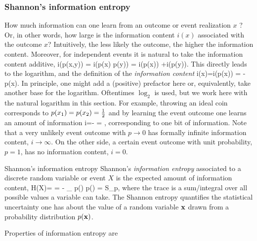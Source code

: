 \subsubsection{Shannon's information entropy}
How much information can one learn from an outcome or event realization $x$ ? Or, in other words, how large is the information content $i(x)$ associated with the outcome $x$? Intuitively, the less likely the outcome, the higher the information content. Moreover, for independent events it is natural to take the information content additive,
\be 
i(p(x,y)) = i(p(x) p(y)) = i(p(x)) +i(p(y)).
\ee 
This directly leads to the logarithm, and the definition of the \emph{information content}
\be 
i(x)=i(p(x)) = -\ln p(x).
\ee 
In principle, one might add a (positive) prefactor here or, equivalently, take another base for the logarithm. Oftentimes $\log_2$ is used, but we work here with the natural logarithm in this section. For example, throwing an ideal coin corresponds to $p(x_1)=p(x_2)=\frac{1}{2}$ and by learning the event outcome one learns an amount of information 
\be 
i=- \ln\half = ,
\ee 
corresponding to one bit of information. Note that a very unlikely event outcome with $p\rightarrow 0$ has formally infinite information content, $i\rightarrow \infty$. On the other side, a certain event outcome with unit probability, $p=1$, has no information content, $i=0$.
\begin{mybox}{Shannon's information entropy}
	Shannon's \emph{information entropy} associated to a discrete random variable or event $X$ is the expected amount of information content,
	\be
	\label{eq:infoShannon}
	H(X)= = - \tr_{\mx} p(\mx) \ln p(\mx) = S_p,
	\ee 
	where the trace is a sum/integral over all possible values a variable can take.
	The Shannon entropy quantifies the statistical uncertainty one has about the value of a random variable $\mathbf{x}$ drawn from a probability distribution $p(\mathbf{x})$.
\end{mybox}
Properties of information entropy are
